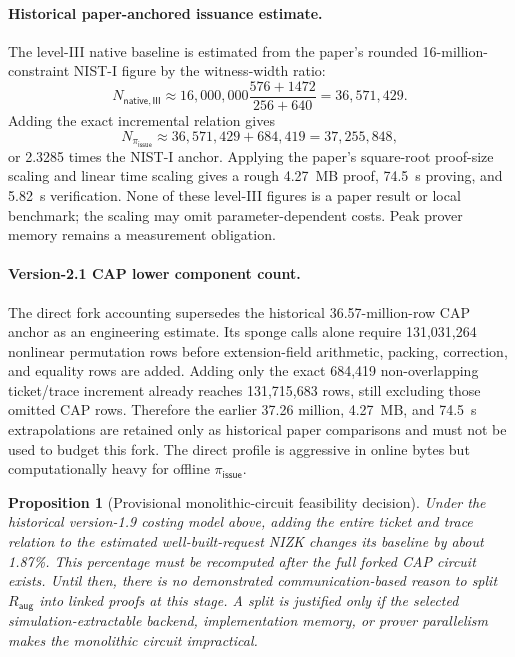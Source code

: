 \documentclass[11pt]{article}
\newtheorem{proposition}[definition]{Proposition}
\begin{document}
\paragraph{Historical paper-anchored issuance estimate.}
The level-III native baseline is estimated from the paper's rounded
16-million-constraint NIST-I figure by the witness-width ratio:
\[
 N_{\mathsf{native,III}}\approx16{,}000{,}000
 \frac{576+1472}{256+640}=36{,}571{,}429.
\]
Adding the exact incremental relation gives
\[
 N_{\pi_{\mathsf{issue}}}\approx36{,}571{,}429+684{,}419
 =37{,}255{,}848,
\]
or 2.3285 times the NIST-I anchor.  Applying the paper's square-root
proof-size scaling and linear time scaling gives a rough 4.27~MB proof,
74.5~s proving, and 5.82~s verification.  None of these level-III figures is a
paper result or local benchmark; the scaling may omit parameter-dependent
costs.  Peak prover memory remains a measurement obligation.

\paragraph{Version-2.1 CAP lower component count.}
The direct fork accounting supersedes the historical 36.57-million-row CAP
anchor as an engineering estimate.  Its sponge calls alone require
131,031,264 nonlinear permutation rows before extension-field arithmetic,
packing, correction, and equality rows are added.  Adding only the exact
684,419 non-overlapping ticket/trace increment already reaches 131,715,683
rows, still excluding those omitted CAP rows.  Therefore the earlier 37.26
million, 4.27~MB, and 74.5~s extrapolations are retained only as historical
paper comparisons and must not be used to budget this fork.  The direct profile
is aggressive in online bytes but computationally heavy for offline
$\pi_{\mathsf{issue}}$.

\begin{proposition}[Provisional monolithic-circuit feasibility decision]
Under the historical version-1.9 costing model above, adding the entire ticket
and trace relation to the estimated well-built-request NIZK changes its
baseline by about 1.87\%.  This percentage must be recomputed after the full
forked CAP circuit exists.  Until then, there is no demonstrated
communication-based reason to split
$R_{\mathsf{aug}}$ into linked proofs at this stage.  A split is justified only
if the selected simulation-extractable backend, implementation memory, or
prover parallelism makes the monolithic circuit impractical.
\end{proposition}
\end{document}
